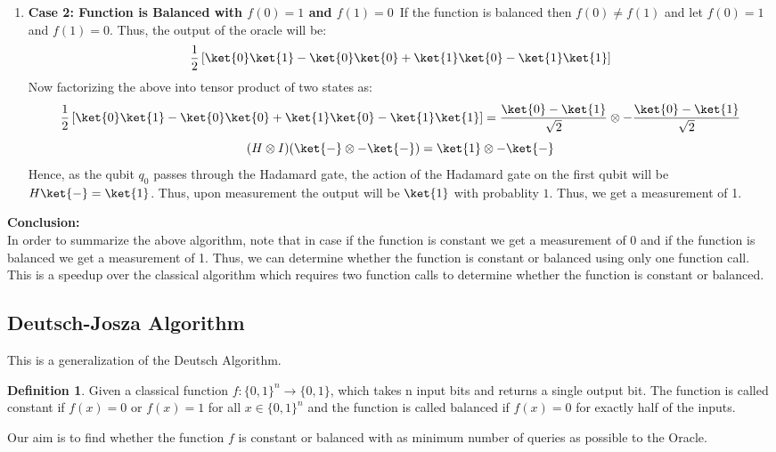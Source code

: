 \documentclass[12pt, oneside]{book}
\theoremstyle{definition}
\newtheorem{definition}{Definition}[section]
\theoremstyle{definition}
\theoremstyle{remark}
\begin{document}
\begin{enumerate}
    \item \textbf{Case 2: Function is Balanced with $f(0)=1$ and $f(1)=0$}\
    If the function is balanced then $f(0)\neq f(1)$ and let $f(0)=1$ and $f(1)=0$. Thus, the output of the oracle will be:
    \[
        \frac{1}{2}\left[\ket{0}\ket{1}-\ket{0}\ket{0}+\ket{1}\ket{0}-\ket{1}\ket{1}\right]
    \]
    Now factorizing the above into tensor product of two states as:
    \[
        \frac{1}{2}\left[\ket{0}\ket{1}-\ket{0}\ket{0}+\ket{1}\ket{0}-\ket{1}\ket{1}\right]=\frac{\ket{0}-\ket{1}}{\sqrt{2}}\otimes -\frac{\ket{0}-\ket{1}}{\sqrt{2}}
    \]
    \[
        (H\otimes I)(\ket{-} \otimes -\ket{-})=\ket{1}\otimes -\ket{-}
    \]
    Hence, as the qubit $q_0$ passes through the Hadamard gate, the action of the Hadamard gate on the first qubit will be $H\ket{-}=\ket{1}$.
    Thus, upon measurement the output will be $\ket{1}$ with probablity $1$. Thus, we get a measurement of 1.
\end{enumerate}
\textbf{Conclusion: }\\
In order to summarize the above algorithm, note that in case if the function is constant we get a measurement of 0 and if the function is balanced we get a measurement of 1. Thus, we can determine whether the function is constant or balanced using only one function call. This is a speedup over the classical algorithm which requires two function calls to determine whether the function is constant or balanced.

\subsection{Deutsch-Josza Algorithm}
This is a generalization of the Deutsch Algorithm.
\begin{definition}
    Given a classical function $f:\{0,1\}^n \rightarrow \{0,1\}$, which takes n input bits and returns a single output bit.
    The function is called constant if $f(x)=0$ or $f(x)=1$ for all $x \in \{0,1\}^n$ and the function is called balanced if $f(x)=0$ for exactly half of the inputs.
\end{definition}

Our aim is to find whether the function $f$ is constant or balanced with as minimum number of queries as possible to the Oracle.
\end{document}
